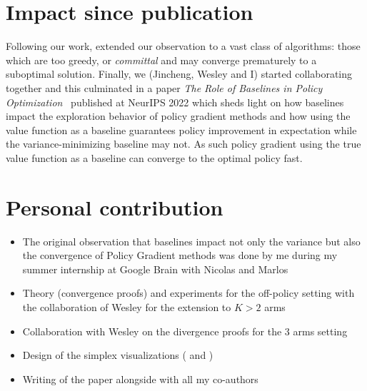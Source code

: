 \section*{Impact since publication}
Following our work, \citet{mei2021understanding} extended our observation to a vast class of algorithms: those which are too greedy, or \emph{committal} and may converge prematurely to a suboptimal solution. Finally, we (Jincheng, Wesley and I) started collaborating together and this culminated in a paper \emph{The Role of Baselines in Policy Optimization}~\citep{mei2022role} published at NeurIPS 2022 which sheds light on how baselines impact the exploration behavior of policy gradient methods and how using the value function as a baseline guarantees policy improvement in expectation while the variance-minimizing baseline may not. As such policy gradient using the true value function as a baseline can converge to the optimal policy fast.


\section*{Personal contribution}
\begin{itemize}
    \item The original observation that baselines impact not only the variance but also the convergence of Policy Gradient methods was done by me during my summer internship at Google Brain with Nicolas and Marlos
    \item Theory (convergence proofs) and experiments for the off-policy setting with the collaboration of Wesley for the extension to $K > 2$ arms
    \item Collaboration with Wesley on the divergence proofs for the 3 arms setting
    \item Design of the simplex visualizations ( and )
    \item Writing of the paper alongside with all my co-authors
\end{itemize}














